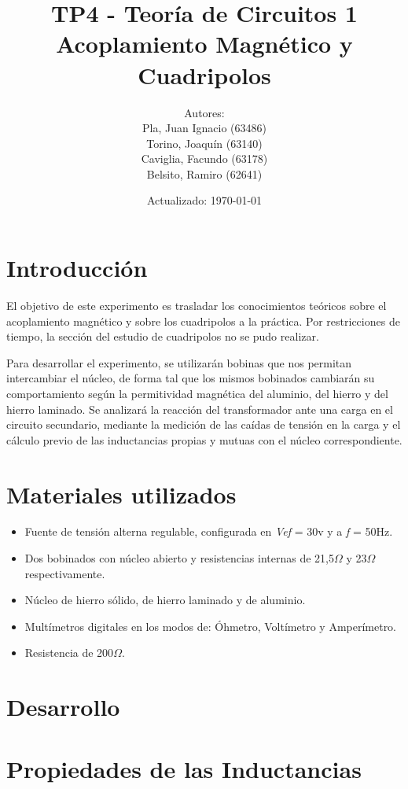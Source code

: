 \documentclass[a4paper,12pt]{article}
\title{TP4 - Teoría de Circuitos 1\\ Acoplamiento Magnético y Cuadripolos}
\author{Autores: \\Pla, Juan Ignacio (63486)\\Torino, Joaquín (63140)\\Caviglia, Facundo (63178)\\Belsito, Ramiro (62641)}
\date{Actualizado: \today}
\begin{document}
\maketitle

\section{Introducción}
\hspace{1cm} El objetivo de este experimento es trasladar los conocimientos teóricos sobre 
el acoplamiento magnético y sobre los cuadripolos a la práctica. Por restricciones de tiempo,
la sección del estudio de cuadripolos no se pudo realizar.

\hspace{1cm} Para desarrollar el experimento, se utilizarán bobinas que nos permitan intercambiar
el núcleo, de forma tal que los mismos bobinados cambiarán su comportamiento según la 
permitividad magnética del aluminio, del hierro y del hierro laminado. Se analizará la reacción
del transformador ante una carga en el circuito secundario, mediante la medición de las caídas de
tensión en la carga y el cálculo previo de las inductancias propias y mutuas con el núcleo correspondiente.


\section{Materiales utilizados}

\begin{itemize}
\item Fuente de tensión alterna regulable, configurada en \textit{Vef} = 30v y a \textit{f} = 50Hz.
\item Dos bobinados con núcleo abierto y resistencias internas de 21,5$\Omega$ y 23$\Omega$ 
respectivamente.
\item Núcleo de hierro sólido, de hierro laminado y de aluminio.
\item Multímetros digitales en los modos de: Óhmetro, Voltímetro y Amperímetro.
\item Resistencia de 200$\Omega$.
\end{itemize}

\section{Desarrollo}

\hspace{1cm} 

\section{Propiedades de las Inductancias}
\end{document}
